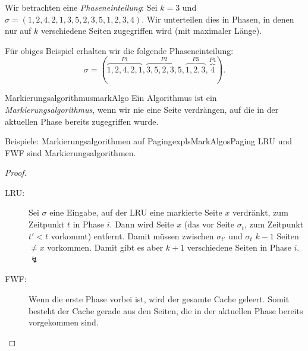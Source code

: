 \documentclass[language=ngerman,algolist]{TemplateLecture}
\begin{document}
Wir betrachten eine \emph{Phaseneinteilung}: Sei $k = 3$ und $\sigma = (1,2,4,2,1,3,5,2,3,5,1,2,3,4)$. Wir unterteilen dies in Phasen, in denen nur auf $k$ verschiedene Seiten zugegriffen wird (mit maximaler Länge). 

\begin{expl}
    Für obiges Beispiel erhalten wir die folgende Phaseneinteilung:
    \begin{equation*}
        \sigma = (\overset{P1}{\overbrace{1,2,4,2,1}},\overset{P2}{\overbrace{3,5,2,3,5}},\overset{P3}{\overbrace{1,2,3}},\overset{P4}{\overbrace{4}}).
    \end{equation*}
\end{expl}

\begin{defi}{Markierungsalgorithmus}{markAlgo}
    Ein Algorithmus ist ein \emph{Markierungsalgorithmus}, wenn wir nie eine Seite verdrängen, auf die in der aktuellen Phase bereits zugegriffen wurde.
\end{defi}

\begin{thm}{Beispiele: Markierungsalgorithmen auf Paging}{explsMarkAlgosPaging}
    LRU und FWF sind Markierungsalgorithmen.
\end{thm}
\begin{proof}
    \begin{description}
        \item[LRU:] Sei $\sigma$ eine Eingabe, auf der LRU eine markierte Seite $x$ verdränkt, zum Zeitpunkt $t$ in Phase $i$. Dann wird Seite $x$ (das vor Seite $\sigma_t$, zum Zeitpunkt $t' < t$ vorkommt) entfernt. Damit müssen zwischen $\sigma_{t'}$ und $\sigma_t$ $k-1$ Seiten $\neq x$ vorkommen. Damit gibt es aber $k+1$ verschiedene Seiten in Phase $i$. $\lightning$
        \item[FWF:] Wenn die erste Phase vorbei ist, wird der gesamte Cache geleert. Somit besteht der Cache gerade aus den Seiten, die in der aktuellen Phase bereits vorgekommen sind.
    \end{description}
\end{proof}
\end{document}
